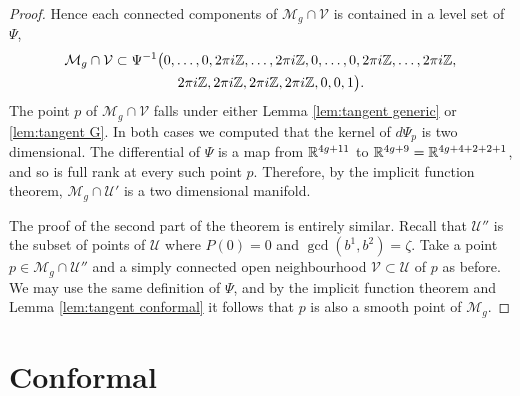 \documentclass{article}
\begin{document}
\begin{thm}
\begin{proof}
Hence each connected components of $\mathcal{M}_g \cap \mathcal{V}$ is contained in a level set of $\Psi$,
\begin{align*}
\mathcal{M}_g \cap \mathcal{V}
\subset \Psi^{-1}\big( &0,\dots,0,2\pi i\mathbb{Z},\dots,2\pi i\mathbb{Z},0,\dots,0,2\pi i\mathbb{Z},\dots,2\pi i\mathbb{Z}, \\
&\quad 2\pi i\mathbb{Z},2\pi i\mathbb{Z},2\pi i\mathbb{Z},2\pi i\mathbb{Z},0,0,1 \big).
\end{align*}
The point $p$ of $\mathcal{M}_g \cap \mathcal{V}$ falls under either Lemma \ref{lem:tangent generic} or \ref{lem:tangent G}. In both cases we computed that the kernel of $d\Psi_p$ is two dimensional. The differential of $\Psi$ is a map from $\mathbb{R}^{4g+11}$ to $\mathbb{R}^{4g+9} = \mathbb{R}^{4g+4+2+2+1}$, and so is full rank at every such point $p$. Therefore, by the implicit function theorem, $\mathcal{M}_g \cap \mathcal{U}'$ is a two dimensional manifold.

The proof of the second part of the theorem is entirely similar. Recall that $\mathcal{U}''$ is the subset of points of $\mathcal{U}$ where $P(0) = 0$ and $\gcd(b^1,b^2)=\zeta$. Take a point $p\in\mathcal{M}_g\cap \mathcal{U}''$ and a simply connected open neighbourhood $\mathcal{V}\subset \mathcal{U}$ of $p$ as before. We may use the same definition of $\Psi$, and by the implicit function theorem and Lemma \ref{lem:tangent conformal} it follows that $p$ is also a smooth point of $\mathcal{M}_g$.
\end{proof}
\end{thm}





\section{Conformal}
\end{document}
